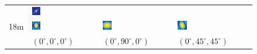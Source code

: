 \begin{figure}[thb]
{\begin{tabular}{llll}
     & \includegraphics[width=0.13\textwidth]{../images/form_factor/supershapes/superquadrics_2_01_0_45_45_6m.png}  \\
18m  & \includegraphics[width=0.13\textwidth]{../images/form_factor/supershapes/superquadrics_2_01_0_0_0_18m.png}
     & \includegraphics[width=0.13\textwidth]{../images/form_factor/supershapes/superquadrics_2_01_0_90_0_18m.png}
     & \includegraphics[width=0.13\textwidth]{../images/form_factor/supershapes/superquadrics_2_01_0_45_45_18m.png}  \\
     & {\small $(0^\circ,0^\circ,0^\circ)$}
     & {\small $(0^\circ,90^\circ,0^\circ)$}
     & {\small $(0^\circ,45^\circ,45^\circ)$}  %
\end{tabular}
}

\vspace{5mm}


\end{figure}
